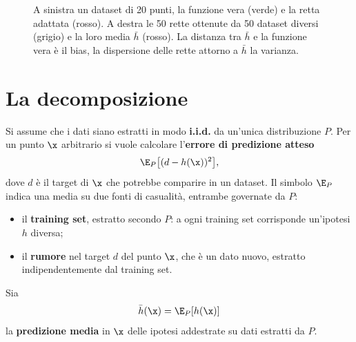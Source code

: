 \begin{figure}[ht]
\centering
{}
\caption{A sinistra un dataset di 20 punti, la funzione vera (verde) e la retta adattata (rosso). A destra le 50
rette ottenute da 50 dataset diversi (grigio) e la loro media $\bar h$ (rosso). La distanza tra $\bar h$ e la
funzione vera è il bias, la dispersione delle rette attorno a $\bar h$ la varianza.}
\label{fig:bv-rette}
\end{figure}

\section{La decomposizione}
\label{sec:decomposizione}

Si assume che i dati siano estratti in modo \textbf{i.i.d.} da un'unica distribuzione $P$. Per un punto $\x$
arbitrario si vuole calcolare l'\textbf{errore di predizione atteso}
\[
\E_P\big[(d-h(\x))^2\big],
\]
dove $d$ è il target di $\x$ che potrebbe comparire in un dataset. Il simbolo $\E_P$ indica una media su due
fonti di casualità, entrambe governate da $P$:
\begin{itemize}
  \item il \textbf{training set}, estratto secondo $P$: a ogni training set corrisponde un'ipotesi $h$ diversa;
  \item il \textbf{rumore} nel target $d$ del punto $\x$, che è un dato nuovo, estratto indipendentemente dal
        training set.
\end{itemize}
Sia
\[
\bar h(\x) = \E_P[h(\x)]
\]
la \textbf{predizione media} in $\x$ delle ipotesi addestrate su dati estratti da $P$.

